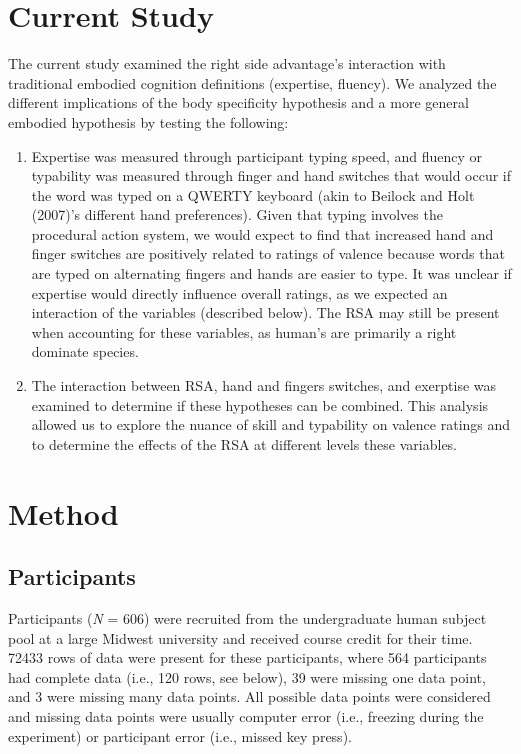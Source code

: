 \documentclass[english,man]{apa6}
\providecommand{\tightlist}{%
  \setlength{\itemsep}{0pt}\setlength{\parskip}{0pt}}
\theoremstyle{definition}
\theoremstyle{definition}
\theoremstyle{definition}
\theoremstyle{remark}
\begin{document}
\section{Current Study}\label{current-study}

The current study examined the right side advantage's interaction with
traditional embodied cognition definitions (expertise, fluency). We
analyzed the different implications of the body specificity hypothesis
and a more general embodied hypothesis by testing the following:

\begin{enumerate}
\def\labelenumi{\arabic{enumi})}
\tightlist
\item
  Expertise was measured through participant typing speed, and fluency
  or typability was measured through finger and hand switches that would
  occur if the word was typed on a QWERTY keyboard (akin to Beilock and
  Holt (2007)'s different hand preferences). Given that typing involves
  the procedural action system, we would expect to find that increased
  hand and finger switches are positively related to ratings of valence
  because words that are typed on alternating fingers and hands are
  easier to type. It was unclear if expertise would directly influence
  overall ratings, as we expected an interaction of the variables
  (described below). The RSA may still be present when accounting for
  these variables, as human's are primarily a right dominate species.
\item
  The interaction between RSA, hand and fingers switches, and exerptise
  was examined to determine if these hypotheses can be combined. This
  analysis allowed us to explore the nuance of skill and typability on
  valence ratings and to determine the effects of the RSA at different
  levels these variables.
\end{enumerate}

\section{Method}\label{method}

\subsection{Participants}\label{participants}

Participants (\emph{N} = 606) were recruited from the undergraduate
human subject pool at a large Midwest university and received course
credit for their time. 72433 rows of data were present for these
participants, where 564 participants had complete data (i.e., 120 rows,
see below), 39 were missing one data point, and 3 were missing many data
points. All possible data points were considered and missing data points
were usually computer error (i.e., freezing during the experiment) or
participant error (i.e., missed key press).
\end{document}
